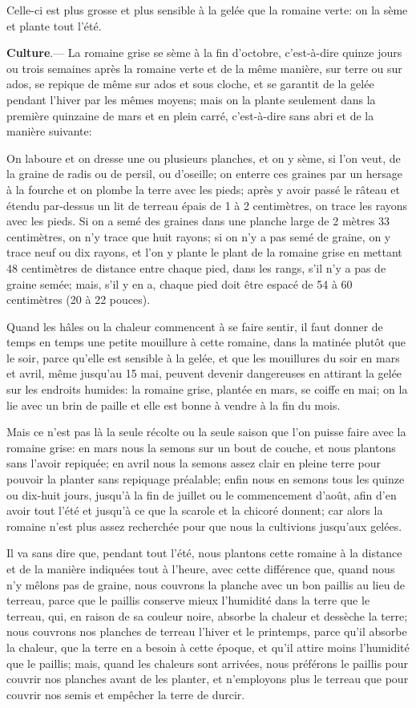 \documentclass[10pt,a4paper]{book}
\begin{document}
Celle-ci est plus grosse et plus sensible à la gelée que la romaine verte: on la sème et plante tout l'été.

\textbf{Culture}.--- La romaine grise se sème à la fin d'octobre, c'est-à-dire quinze jours ou trois semaines après la romaine verte et de la même manière, sur terre ou sur ados, se repique de même sur ados et sous cloche, et se garantit de la gelée pendant l'hiver par les mêmes moyens; mais on la plante seulement dans la première quinzaine de mars et en plein carré, c'est-à-dire sans abri et de la manière suivante:

On laboure et on dresse une ou plusieurs planches, et on y sème, si l'on veut, de la graine de radis ou de persil, ou d'oseille; on enterre ces graines par un hersage à la fourche et on plombe la terre avec les pieds; après y avoir passé le râteau et étendu par-dessus un lit de terreau épais de 1 à 2 centimètres, on trace les rayons avec les pieds. Si on a semé des graines dans une planche large de 2 mètres 33 centimètres, on n'y trace que huit rayons; si on n'y a pas semé de graine, on y trace neuf ou dix rayons, et l'on y plante le plant de la romaine grise en mettant 48 centimètres de distance entre chaque pied, dans les rangs, s'il n'y a pas de graine semée; mais, s'il y en a, chaque pied doit être espacé de 54 à 60 centimètres (20 à 22 pouces).

Quand les hâles ou la chaleur commencent à se faire sentir, il faut donner de temps en temps une petite mouillure à cette romaine, dans la matinée plutôt que le soir, parce qu'elle est sensible à la gelée, et que les mouillures du soir en mars et avril, même jusqu'au 15 mai, peuvent devenir dangereuses en attirant la gelée sur les endroits humides: la romaine grise, plantée en mars, se coiffe en mai; on la lie avec un brin de paille et elle est bonne à vendre à la fin du mois.

Mais ce n'est pas là la seule récolte ou la seule saison que l'on puisse faire avec la romaine grise: en mars nous la semons sur un bout de couche, et nous plantons sans l'avoir repiquée; en avril nous la semons assez clair en pleine terre pour pouvoir la planter sans repiquage préalable; enfin nous en semons tous les quinze ou dix-huit jours, jusqu'à la fin de juillet ou le commencement d'août, afin d'en avoir tout l'été et jusqu'à ce que la scarole et la chicoré donnent; car alors la romaine n'est plus assez recherchée pour que nous la cultivions jusqu'aux gelées.

Il va sans dire que, pendant tout l'été, nous plantons cette romaine à la distance et de la manière indiquées tout à l'heure, avec cette différence que, quand nous n'y mêlons pas de graine, nous couvrons la planche avec un bon paillis au lieu de terreau, parce que le paillis conserve mieux l'humidité dans la terre que le terreau, qui, en raison de sa couleur noire, absorbe la chaleur et dessèche la terre; nous couvrons nos planches de terreau l'hiver et le printemps, parce qu'il absorbe la chaleur, que la terre en a besoin à cette époque, et qu'il attire moins l'humidité que le paillis; mais, quand les chaleurs sont arrivées, nous préférons le paillis pour couvrir nos planches avant de les planter, et n'employons plus le terreau que pour couvrir nos semis et empêcher la terre de durcir.
\end{document}
